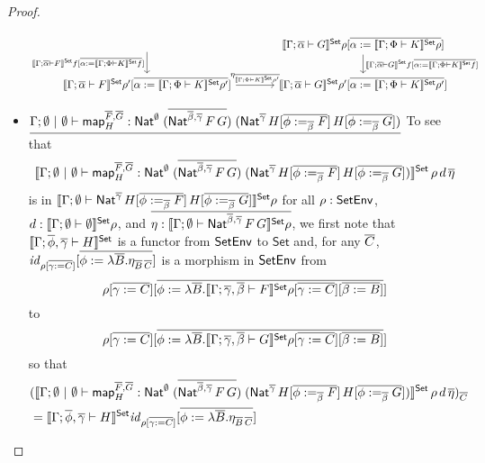 \documentclass[runningheads]{llncs}
\newcommand{\set}{\mathsf{Set}}
\renewcommand{\id}{\mathit{id}}
\newcommand{\map}{\mathsf{map}}
\renewcommand{\id}{\mathit{id}}
\begin{document}
\begin{proof}
\begin{itemize}
{\[\begin{tikzcd}[column sep = large]
\ar[d, "{\setsem{\Gamma; \ol{\alpha} \vdash F} f [\ol{\alpha := 
        \setsem{\Gamma;\Phi \vdash K}f}]}"']
& \setsem{\Gamma;
  \ol{\alpha} \vdash G}\rho[\ol{\alpha := \setsem{\Gamma;\Phi \vdash
      K}\rho}]
\ar[d, "{\setsem{\Gamma; \ol{\alpha} \vdash G} f [\ol{\alpha := 
        \setsem{\Gamma;\Phi \vdash K}f}]}"]\\
\setsem{\Gamma; \ol{\alpha} \vdash F}\rho'[\ol{\alpha :=
    \setsem{\Gamma;\Phi \vdash K}\rho'}] \ar[r,
  "{\eta_{\ol{\setsem{\Gamma;\Phi \vdash K}\rho'}} }"]
& \setsem{\Gamma; \ol{\alpha} \vdash G}\rho'[\ol{\alpha :=
    \setsem{\Gamma;\Phi \vdash K}\rho'}]
\end{tikzcd}\]}

\item 
  $\underline{\Gamma;\emptyset~|~\emptyset \vdash
  \map^{\ol{F},\ol{G}}_H :
  \Nat^\emptyset\;(\ol{\Nat^{\ol{\beta},\ol{\gamma}}\,F\,G})\;
  (\Nat^{\ol{\gamma}}\,H[\ol{\phi :=_{\ol{\beta}} F}]\,H[\ol{\phi
      :=_{\ol{\beta}} G}])}$\;
To see that
\[
\setsem{\Gamma; \emptyset~|~\emptyset \vdash \map^{\ol{F},\ol{G}}_H
    : \Nat^\emptyset\;(\ol{\Nat^{\ol{\beta},\ol{\gamma}}\,F\,G})\;
    (\Nat^{\ol{\gamma}}\,H[\ol{\phi :=_{\ol{\beta}} F}]\,H[\ol{\phi
        :=_{\ol{\beta}} G}])}\,\rho\,d\, \ol{\eta}
\]
is in $\setsem{\Gamma; \emptyset \vdash
    \Nat^{\ol{\gamma}}\,H[\ol{\phi :=_{\ol{\beta}} F}]\,H[\ol{\phi
        :=_{\ol{\beta}} G}]} \rho$
for all $\rho : \mathsf{SetEnv}$, $d : \setsem{\Gamma;\emptyset \vdash \emptyset} \rho$,
and $\ol{\eta : \setsem{\Gamma; \emptyset
  \vdash\Nat^{\ol{\beta},\ol{\gamma}}\,F\,G} \rho}$,
  we first note that
$\setsem{\Gamma ;\ol{\phi}, \ol{\gamma} \vdash H}$ is a functor from
  $\mathsf{SetEnv}$ to $\set$ and, for any $\overline{C}$, $\id_{\rho[\ol{\gamma :=
        C}]}[\ol{\phi := \lambda \ol{B}. \eta_{\ol{B}\,\ol{C}}}]$ is a
  morphism in $\mathsf{SetEnv}$ from \[\rho[\ol{\gamma := C}][\ol{\phi :=
      \lambda \ol{B}.\setsem{\Gamma; \ol{\gamma},\ol{\beta} \vdash
        F}\rho[\ol{\gamma := C}][\ol{\beta := B}]}]\] to
\[\rho[\ol{\gamma := C}][\ol{\phi := \lambda \ol{B}.\setsem{\Gamma;
\ol{\gamma},\ol{\beta} \vdash G}\rho[\ol{\gamma := C}][\ol{\beta := B}]}]\]
so that
\begin{align*}
&(\setsem{\Gamma; \emptyset~|~\emptyset \vdash
  \map^{\ol{F},\ol{G}}_H :
\Nat^\emptyset\;(\ol{\Nat^{\ol{\beta},\ol{\gamma}}\,F\,G})\;
(\Nat^{\ol{\gamma}}\,H[\ol{\phi :=_{\ol{\beta}} F}]\,H[\ol{\phi
    :=_{\ol{\beta}} G}])}\,\rho\,d\, \ol{\eta})_{\ol{C}} \\
  &=  \setsem{\Gamma; \ol{\phi},\ol{\gamma} \vdash H}\id_{\rho[\ol{\gamma
      := C}]}[\ol{\phi := \lambda \ol{B}. \eta_{\ol{B}\,\ol{C}}}]

\end{align*}
\end{itemize}
\end{proof}
\end{document}
